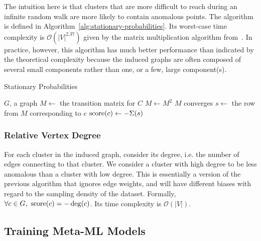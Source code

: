 The intuition here is that clusters that are more difficult to reach during an infinite random walk are more likely to contain anomalous points.
The algorithm is defined in Algorithm~\ref{alg:stationary-probabilities}.
Its worst-case time complexity is $\mathcal{O}(|V|^{2.37})$ given by the matrix multiplication algorithm from~\cite{alman2021refined}.
In practice, however, this algorithm has much better performance than indicated by the theoretical complexity because the induced graphs are often composed of several small components rather than one, or a few, large component(s).

\begin{algorithm}[h]
    \caption{Stationary Probabilities}
    \label{alg:stationary-probabilities}
\begin{algorithmic}[1]
    \REQUIRE $G$, a graph
        \STATE $M \gets$ the transition matrix for $C$
        \REPEAT
            \STATE $M \gets M^2$
        \UNTIL $M$ converges
            \STATE $s \gets $ the row from $M$ corresponding to $c$
            \STATE $\operatorname{score}(c) \gets -\Sigma(s)$ 
        \ENDFOR
    \ENDFOR
\end{algorithmic}
\end{algorithm}


\subsubsection{Relative Vertex Degree}
\label{subsubsec:methods:individual-algorithms:relative-vertex-degree}
For each cluster in the induced graph, consider its degree, i.e. the number of edges connecting to that cluster.
We consider a cluster with high degree to be less anomalous than a cluster with low degree.
This is essentially a version of the previous algorithm that ignores edge weights, and will have different biases with regard to the sampling density of the dataset.
Formally, $\forall c \in G, \ \operatorname{score}(c) = -\deg(c)$.
Its time complexity is $\mathcal{O}(|V|)$.


\subsection{Training Meta-ML Models}
\label{subsec:methods:training-meta-ml-models}


